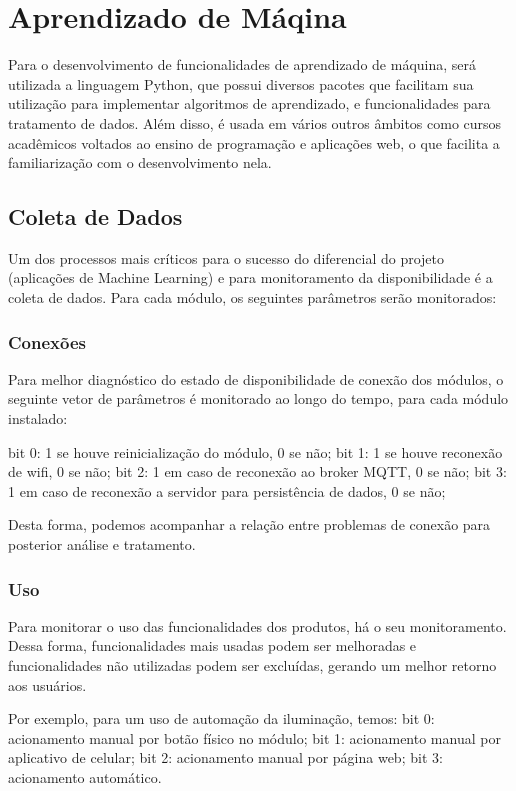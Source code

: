 \chapter{Aprendizado de Máqina}

Para o desenvolvimento de funcionalidades de aprendizado de máquina, será utilizada a linguagem Python, que possui diversos pacotes que facilitam sua utilização para implementar algoritmos de aprendizado, e funcionalidades para tratamento de dados. Além disso, é usada em vários outros âmbitos como cursos acadêmicos voltados ao ensino de programação e aplicações web, o que facilita a familiarização com o desenvolvimento nela.

\section{Coleta de Dados}
Um dos processos mais críticos para o sucesso do diferencial do projeto (aplicações de Machine Learning) e para monitoramento da disponibilidade é a coleta de dados. Para cada módulo, os seguintes parâmetros serão monitorados:

\subsection{Conexões}
Para melhor diagnóstico do estado de disponibilidade de conexão dos módulos, o seguinte vetor de parâmetros é monitorado ao longo do tempo, para cada módulo instalado:

bit 0: 1 se houve reinicialização do módulo, 0 se não;
bit 1: 1 se houve reconexão de wifi, 0 se não;
bit 2: 1 em caso de reconexão ao broker MQTT, 0 se não;
bit 3: 1 em caso de reconexão a servidor para persistência de dados, 0 se não;

Desta forma, podemos acompanhar a relação entre problemas de conexão para posterior análise e tratamento.

\subsection{Uso}
Para monitorar o uso das funcionalidades dos produtos, há o seu monitoramento. Dessa forma, funcionalidades mais usadas podem ser melhoradas e funcionalidades não utilizadas podem ser excluídas, gerando um melhor retorno aos usuários.

	Por exemplo, para um uso de automação da iluminação, temos:
bit 0: acionamento manual por botão físico no módulo;
bit 1: acionamento manual por aplicativo de celular;
bit 2: acionamento manual por página web;
bit 3: acionamento automático.
